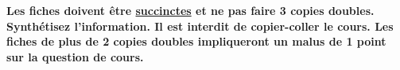 \documentclass[a4paper, 12pt, final, garamond]{book}
\begin{document}
\begin{framed}
    \centering\bfseries\large
    Les fiches doivent être \ul{succinctes} et ne pas faire 3 copies doubles.
    Synthétisez l'information. Il est interdit de copier-coller le cours.
    \bigbreak \Huge
    Les fiches de plus de 2 copies doubles impliqueront un malus de 1 point sur
    la question de cours.
\end{framed}
\end{document}
